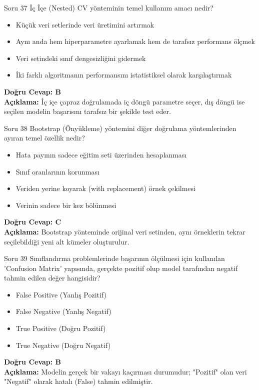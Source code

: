 \documentclass[12pt,a4paper]{article}
\begin{document}
\begin{testcard}{Soru 37}
    İç İçe (Nested) CV yönteminin temel kullanım amacı nedir?
    \begin{itemize}
        \item[A)] Küçük veri setlerinde veri üretimini artırmak
        \item[B)] Aynı anda hem hiperparametre ayarlamak hem de tarafsız performans ölçmek
        \item[C)] Veri setindeki sınıf dengesizliğini gidermek
        \item[D)] İki farklı algoritmanın performansını istatistiksel olarak karşılaştırmak
    \end{itemize}
    \tcblower
    \textbf{Doğru Cevap: B} \\
    \textbf{Açıklama:} İç içe çapraz doğrulamada iç döngü parametre seçer, dış döngü ise seçilen modelin başarısını tarafsız bir şekilde test eder.
\end{testcard}

\begin{testcard}{Soru 38}
    Bootstrap (Önyükleme) yöntemini diğer doğrulama yöntemlerinden ayıran temel özellik nedir?
    \begin{itemize}
        \item[A)] Hata payının sadece eğitim seti üzerinden hesaplanması
        \item[B)] Sınıf oranlarının korunması
        \item[C)] Veriden yerine koyarak (with replacement) örnek çekilmesi
        \item[D)] Verinin sadece bir kez bölünmesi
    \end{itemize}
    \tcblower
    \textbf{Doğru Cevap: C} \\
    \textbf{Açıklama:} Bootstrap yönteminde orijinal veri setinden, aynı örneklerin tekrar seçilebildiği yeni alt kümeler oluşturulur.
\end{testcard}

\begin{testcard}{Soru 39}
    Sınıflandırma problemlerinde başarının ölçülmesi için kullanılan 'Confusion Matrix' yapısında, gerçekte pozitif olup model tarafından negatif tahmin edilen değer hangisidir?
    \begin{itemize}
        \item[A)] False Positive (Yanlış Pozitif)
        \item[B)] False Negative (Yanlış Negatif)
        \item[C)] True Positive (Doğru Pozitif)
        \item[D)] True Negative (Doğru Negatif)
    \end{itemize}
    \tcblower
    \textbf{Doğru Cevap: B} \\
    \textbf{Açıklama:} Modelin gerçek bir vakayı kaçırması durumudur; "Pozitif" olan veri "Negatif" olarak hatalı (False) tahmin edilmiştir.
\end{testcard}
\end{document}
